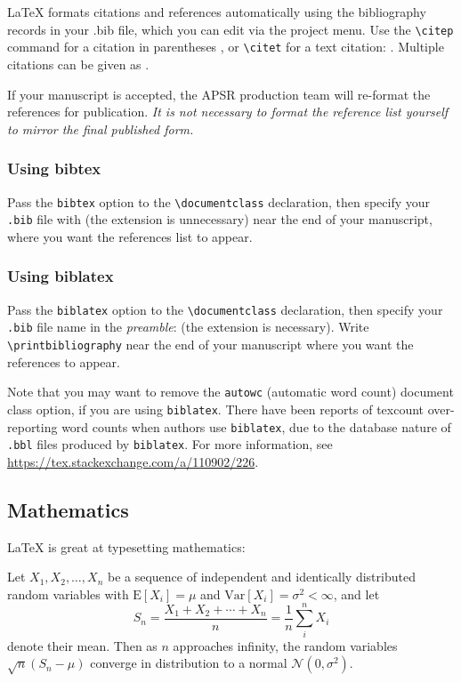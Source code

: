 \documentclass[biblatex,nonblind]{apsr_submission}
\begin{document}
\LaTeX{} formats citations and references automatically using the bibliography records in your .bib file, which you can edit via the project menu. Use the \verb|\citep| command for a citation in parentheses \citep{greenwade93}, or  \verb|\citet| for a text citation: \citet{greenwade93}. Multiple citations can be given as \citep{greenwade93,knuth1984texbook}.

If your manuscript is accepted, the APSR production team will re-format the references for publication. \emph{It is not necessary to format the reference list yourself to mirror the final published form.}

\subsubsection{Using bibtex} Pass the \texttt{bibtex} option to the \verb|\documentclass| declaration, then specify your \texttt{.bib} file with \verb|| (the extension is unnecessary) near the end of your manuscript, where you want the references list to appear.

\subsubsection{Using biblatex} Pass the \texttt{biblatex} option to the \verb|\documentclass| declaration, then specify your \texttt{.bib} file name in the \emph{preamble}: \verb|| (the extension is necessary). Write \verb|\printbibliography| near the end of your manuscript where you want the references to appear.

Note that you may want to remove the \texttt{autowc} (automatic word count) document class option, if you are using \texttt{biblatex}. There have been reports of texcount over-reporting word counts when authors use \texttt{biblatex}, due to the database nature of \texttt{.bbl} files produced by \texttt{biblatex}. For more information, see \url{https://tex.stackexchange.com/a/110902/226}.


\subsection{Mathematics}

\LaTeX{} is great at typesetting mathematics:

Let $X_1, X_2, \ldots, X_n$ be a sequence of independent and identically distributed random variables with $\text{E}[X_i] = \mu$ and $\text{Var}[X_i] = \sigma^2 < \infty$, and let
\begin{equation}
\label{eq:CLT}
S_n = \frac{X_1 + X_2 + \cdots + X_n}{n}
      = \frac{1}{n}\sum_{i}^{n} X_i
\end{equation}
denote their mean. Then as $n$ approaches infinity, the random variables $\sqrt{n}(S_n - \mu)$ converge in distribution to a normal $\mathcal{N}(0, \sigma^2)$.
\end{document}
